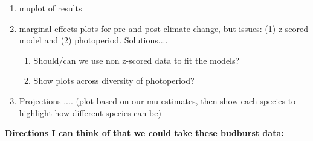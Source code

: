 \documentclass[11pt,letterpaper]{article}
\begin{document}
\begin{enumerate}
\item muplot of results
\item marginal effects plots for pre and post-climate change, but issues: (1) z-scored model and (2) photoperiod. Solutions....
\begin{enumerate}
\item Should/can we use non z-scored data to fit the models?
\item Show plots across diversity of photoperiod?
\end{enumerate}
\item Projections .... (plot based on our mu estimates, then show each species to highlight how different species can be)
\end{enumerate}


{\bf Directions I can think of that we could take these budburst data:}
\end{document}
